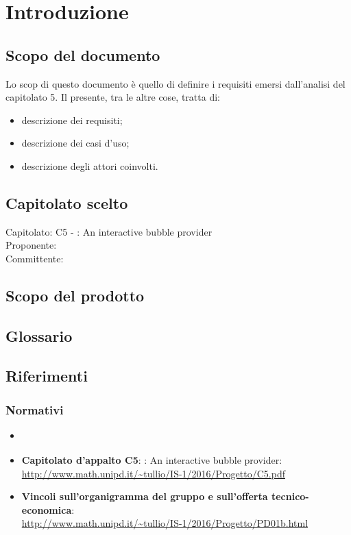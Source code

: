 \section{Introduzione}

\subsection{Scopo del documento}
Lo scop di questo documento è quello di definire i requisiti emersi dall'analisi del capitolato 5.
Il presente, tra le altre cose, tratta di:
\begin{itemize}
	\item descrizione dei requisiti;
	\item descrizione dei casi d'uso;
	\item descrizione degli attori coinvolti.
\end{itemize}

\subsection{Capitolato scelto}
Capitolato: C5 - \ProjectName{}: An interactive bubble provider \\
Proponente: \Proponente{} \\
Committente: \CommittenteInline{} \\

\subsection{Scopo del prodotto}
\ScopoDelProdotto

\subsection{Glossario}
\GlossarioIntroduzione

\subsection{Riferimenti}
\subsubsection{Normativi}
\begin{itemize}
	\item \textbf{\NormeDiProgetto}
	\item\textbf{Capitolato d'appalto C5}: \ProjectName{}: An interactive bubble provider:\\ \url{http://www.math.unipd.it/~tullio/IS-1/2016/Progetto/C5.pdf}
	\item \textbf{Vincoli sull'organigramma del gruppo e sull'offerta tecnico-economica}: \\ \url{http://www.math.unipd.it/~tullio/IS-1/2016/Progetto/PD01b.html}
\end{itemize}

